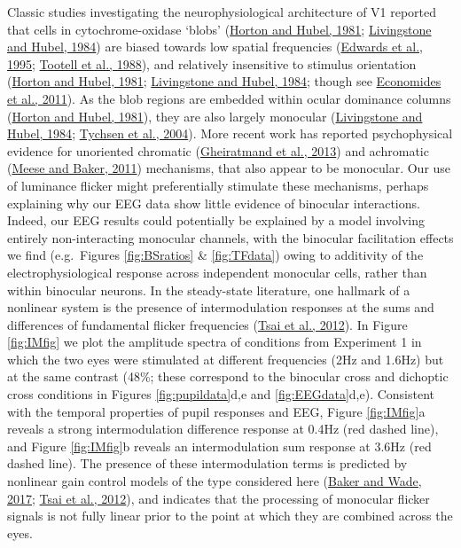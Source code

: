 \documentclass[
]{article}
\begin{document}
Classic studies investigating the neurophysiological architecture of V1 reported that cells in cytochrome-oxidase `blobs' (\protect\hyperlink{ref-Horton1981}{Horton and Hubel, 1981}; \protect\hyperlink{ref-Livingstone1984}{Livingstone and Hubel, 1984}) are biased towards low spatial frequencies (\protect\hyperlink{ref-Edwards1995}{Edwards et al., 1995}; \protect\hyperlink{ref-Tootell1988}{Tootell et al., 1988}), and relatively insensitive to stimulus orientation (\protect\hyperlink{ref-Horton1981}{Horton and Hubel, 1981}; \protect\hyperlink{ref-Livingstone1984}{Livingstone and Hubel, 1984}; though see \protect\hyperlink{ref-Economides2011}{Economides et al., 2011}). As the blob regions are embedded within ocular dominance columns (\protect\hyperlink{ref-Horton1981}{Horton and Hubel, 1981}), they are also largely monocular (\protect\hyperlink{ref-Livingstone1984}{Livingstone and Hubel, 1984}; \protect\hyperlink{ref-Tychsen2004}{Tychsen et al., 2004}). More recent work has reported psychophysical evidence for unoriented chromatic (\protect\hyperlink{ref-Gheiratmand2013}{Gheiratmand et al., 2013}) and achromatic (\protect\hyperlink{ref-Meese2011}{Meese and Baker, 2011}) mechanisms, that also appear to be monocular. Our use of luminance flicker might preferentially stimulate these mechanisms, perhaps explaining why our EEG data show little evidence of binocular interactions. Indeed, our EEG results could potentially be explained by a model involving entirely non-interacting monocular channels, with the binocular facilitation effects we find (e.g.~Figures \ref{fig:BSratios} \& \ref{fig:TFdata}) owing to additivity of the electrophysiological response across independent monocular cells, rather than within binocular neurons. In the steady-state literature, one hallmark of a nonlinear system is the presence of intermodulation responses at the sums and differences of fundamental flicker frequencies (\protect\hyperlink{ref-Tsai2012}{Tsai et al., 2012}). In Figure \ref{fig:IMfig} we plot the amplitude spectra of conditions from Experiment 1 in which the two eyes were stimulated at different frequencies (2Hz and 1.6Hz) but at the same contrast (48\%; these correspond to the binocular cross and dichoptic cross conditions in Figures \ref{fig:pupildata}d,e and \ref{fig:EEGdata}d,e). Consistent with the temporal properties of pupil responses and EEG, Figure \ref{fig:IMfig}a reveals a strong intermodulation difference response at 0.4Hz (red dashed line), and Figure \ref{fig:IMfig}b reveals an intermodulation sum response at 3.6Hz (red dashed line). The presence of these intermodulation terms is predicted by nonlinear gain control models of the type considered here (\protect\hyperlink{ref-Baker2017}{Baker and Wade, 2017}; \protect\hyperlink{ref-Tsai2012}{Tsai et al., 2012}), and indicates that the processing of monocular flicker signals is not fully linear prior to the point at which they are combined across the eyes.
\end{document}
